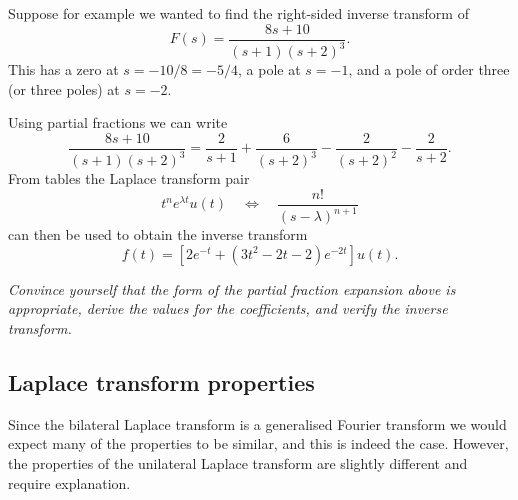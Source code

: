 \documentclass[10pt]{beamer}
\begin{document}
Suppose for example we wanted to find the right-sided inverse transform of 
\begin{equation*}
  F(s) = \frac{8s+10}{(s+1)(s+2)^3}.
\end{equation*}
This has a zero at $s=-10/8 = -5/4$, a pole at $s=-1$, and a pole of order three (or three poles) at $s=-2$.

Using partial fractions we can write
\begin{equation*}
  \frac{8s+10}{(s+1)(s+2)^3} = \frac{2}{s+1} + \frac{6}{(s+2)^3} - \frac{2}{(s+2)^2} - \frac{2}{s+2}.
\end{equation*}
From tables the Laplace transform pair
\begin{equation*}
  t^n e^{\lambda t} u(t) \quad \Longleftrightarrow \quad \frac{n!}{(s-\lambda)^{n+1}}
\end{equation*}
can then be used to obtain the inverse transform
\begin{equation*}
  f(t) = [ 2e^{-t} + (3 t^2 - 2 t - 2) e^{-2 t} ] u(t). 
\end{equation*}

{\em Convince
yourself that the form of the partial fraction expansion above is appropriate, derive the values for the coefficients, and verify the inverse transform.}

\subsection{Laplace transform properties}

Since the bilateral Laplace transform is a generalised Fourier transform we would expect many of the properties to be similar, and this is indeed the case.  However, the properties of the unilateral Laplace transform are slightly different and require explanation.
\end{document}
